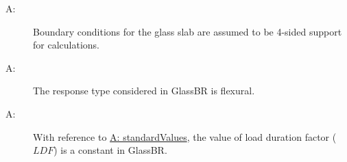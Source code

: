 \documentclass[12pt]{article}
\newcounter{assumpnum}
\newcommand{\atheassumpnum}{A\theassumpnum}
\begin{document}
\begin{description}
\item[\atheassumpnum\label{A:boundaryConditions}:]Boundary conditions for the glass slab are assumed to be 4-sided support for calculations.
\end{description}
\begin{description}
\item[\atheassumpnum\label{A:responseType}:]The response type considered in GlassBR is flexural.
\end{description}
\begin{description}
\item[\atheassumpnum\label{A:ldfConstant}:]With reference to \hyperref[A:standardValues]{A: standardValues}, the value of load duration factor ($LDF$) is a constant in GlassBR.
\end{description}
\end{document}
